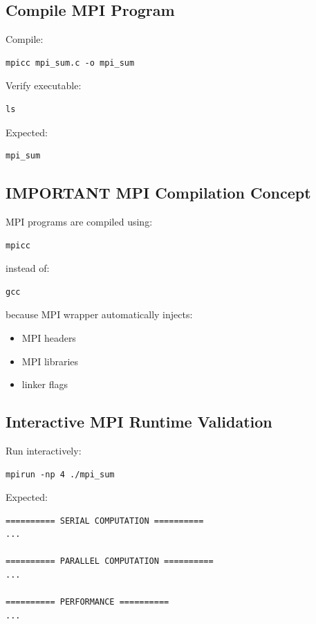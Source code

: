\documentclass[11pt]{article}
\begin{document}
\subsection{Compile MPI Program}
\label{sec:org633a8f4}

Compile:

\begin{verbatim}
mpicc mpi_sum.c -o mpi_sum
\end{verbatim}

Verify executable:

\begin{verbatim}
ls
\end{verbatim}

Expected:

\begin{verbatim}
mpi_sum
\end{verbatim}
\subsection{IMPORTANT MPI Compilation Concept}
\label{sec:orgad35786}

MPI programs are compiled using:

\begin{verbatim}
mpicc
\end{verbatim}

instead of:

\begin{verbatim}
gcc
\end{verbatim}

because MPI wrapper automatically injects:

\begin{itemize}
\item MPI headers
\item MPI libraries
\item linker flags
\end{itemize}
\subsection{Interactive MPI Runtime Validation}
\label{sec:orgeb019a3}

Run interactively:

\begin{verbatim}
mpirun -np 4 ./mpi_sum
\end{verbatim}

Expected:

\begin{verbatim}
========== SERIAL COMPUTATION ==========
...

========== PARALLEL COMPUTATION ==========
...

========== PERFORMANCE ==========
...
\end{verbatim}
\end{document}
